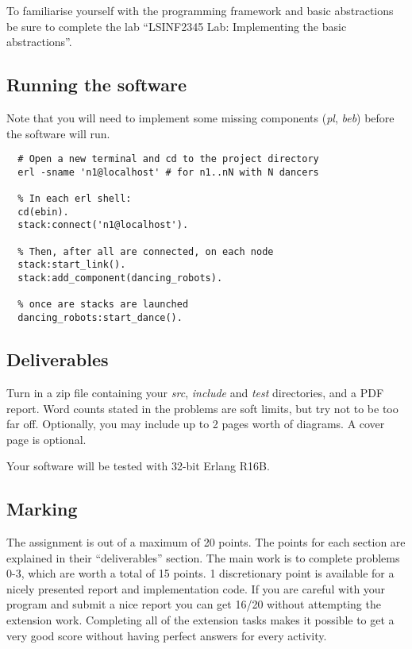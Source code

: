\documentclass[a4paper]{article}
\begin{document}
To familiarise yourself with the programming framework and basic abstractions
be sure to complete the lab ``LSINF2345 Lab: Implementing the basic
abstractions''.

\subsection*{Running the software} %
\label{sub:running_the_software}

Note that you will need to implement some missing components (\emph{pl},
\emph{beb}) before the software will run.

\begin{verbatim}
  # Open a new terminal and cd to the project directory
  erl -sname 'n1@localhost' # for n1..nN with N dancers

  % In each erl shell:
  cd(ebin).
  stack:connect('n1@localhost').

  % Then, after all are connected, on each node
  stack:start_link().
  stack:add_component(dancing_robots).

  % once are stacks are launched
  dancing_robots:start_dance().
\end{verbatim}



\subsection*{Deliverables} %
\label{sub:deliverables}

Turn in a zip file containing your \emph{src}, \emph{include} and \emph{test}
directories, and a PDF report. Word counts stated in the problems are soft
limits, but try not to be too far off. Optionally, you may include up to 2
pages worth of diagrams. A cover page is optional.

Your software will be tested with 32-bit Erlang R16B.


\subsection*{Marking} %
\label{sub:marking}

The assignment is out of a maximum of 20 points. The points for each section
are explained in their ``deliverables'' section. The main work is to complete
problems 0-3, which are worth a total of 15 points. 1 discretionary point is
available for a nicely presented report and implementation code. If you
are careful with your program and submit a nice report you can get 16/20
without attempting the extension work. Completing all of the extension tasks
makes it possible to get a very good score without having perfect answers for
every activity.
\end{document}
